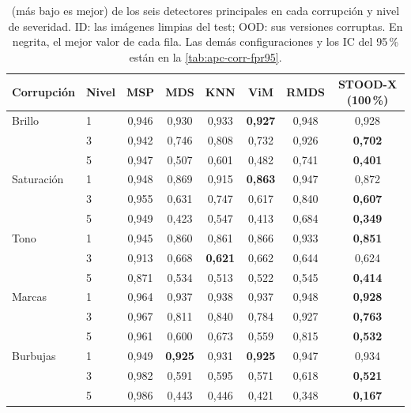 \begin{table}
\centering
\scriptsize
\setlength{\tabcolsep}{3pt}
\caption{ (más bajo es mejor) de los seis detectores principales en cada corrupción y nivel de severidad. ID: las imágenes limpias del test; OOD: sus versiones corruptas. En negrita, el mejor valor de cada fila. Las demás configuraciones y los IC del 95\,\% están en la \cref{tab:apc-corr-fpr95}.}
\label{tab:ood-corr-fpr95}
\begin{tabular*}{\linewidth}{@{\extracolsep{\fill}}llcccccc}
\toprule
Corrupción & Nivel & MSP & MDS & KNN & ViM & RMDS & STOOD-X (100\,\%) \\
\midrule
Brillo & 1 & 0{,}946 & 0{,}930 & 0{,}933 & \textbf{0{,}927} & 0{,}948 & 0{,}928 \\
 & 3 & 0{,}942 & 0{,}746 & 0{,}808 & 0{,}732 & 0{,}926 & \textbf{0{,}702} \\
 & 5 & 0{,}947 & 0{,}507 & 0{,}601 & 0{,}482 & 0{,}741 & \textbf{0{,}401} \\
\addlinespace[2pt]
Saturación & 1 & 0{,}948 & 0{,}869 & 0{,}915 & \textbf{0{,}863} & 0{,}947 & 0{,}872 \\
 & 3 & 0{,}955 & 0{,}631 & 0{,}747 & 0{,}617 & 0{,}840 & \textbf{0{,}607} \\
 & 5 & 0{,}949 & 0{,}423 & 0{,}547 & 0{,}413 & 0{,}684 & \textbf{0{,}349} \\
\addlinespace[2pt]
Tono & 1 & 0{,}945 & 0{,}860 & 0{,}861 & 0{,}866 & 0{,}933 & \textbf{0{,}851} \\
 & 3 & 0{,}913 & 0{,}668 & \textbf{0{,}621} & 0{,}662 & 0{,}644 & 0{,}624 \\
 & 5 & 0{,}871 & 0{,}534 & 0{,}513 & 0{,}522 & 0{,}545 & \textbf{0{,}414} \\
\addlinespace[2pt]
Marcas & 1 & 0{,}964 & 0{,}937 & 0{,}938 & 0{,}937 & 0{,}948 & \textbf{0{,}928} \\
 & 3 & 0{,}967 & 0{,}811 & 0{,}840 & 0{,}784 & 0{,}927 & \textbf{0{,}763} \\
 & 5 & 0{,}961 & 0{,}600 & 0{,}673 & 0{,}559 & 0{,}815 & \textbf{0{,}532} \\
\addlinespace[2pt]
Burbujas & 1 & 0{,}949 & \textbf{0{,}925} & 0{,}931 & \textbf{0{,}925} & 0{,}947 & 0{,}934 \\
 & 3 & 0{,}982 & 0{,}591 & 0{,}595 & 0{,}571 & 0{,}618 & \textbf{0{,}521} \\
 & 5 & 0{,}986 & 0{,}443 & 0{,}446 & 0{,}421 & 0{,}348 & \textbf{0{,}167} \\

\end{tabular*}
\end{table}
